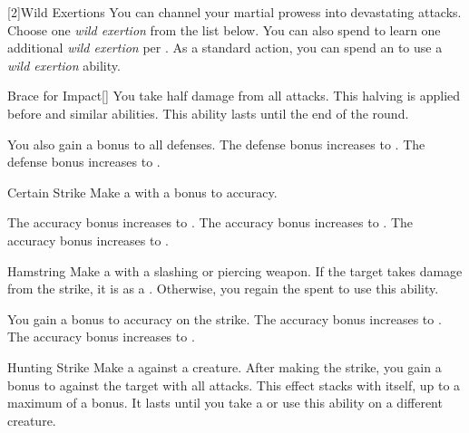         [2]{Wild Exertions} 
        You can channel your martial prowess into devastating attacks.
        Choose one \textit{wild exertion} from the list below.
        You can also spend  to learn one additional \textit{wild exertion} per .
        As a standard action, you can spend an  to use a \textit{wild exertion} ability.
        {
            \begin{freeability}{Brace for Impact}[]
                You take half damage from all attacks.
                This halving is applied before  and similar abilities.
                This ability lasts until the end of the round.

                \rankline
                 You also gain a  bonus to all defenses.
                 The defense bonus increases to .
                 The defense bonus increases to .
            \end{freeability}

            \begin{apability}{Certain Strike}
                Make a  with a  bonus to accuracy.

                \rankline
                 The accuracy bonus increases to .
                 The accuracy bonus increases to .
                 The accuracy bonus increases to .
            \end{apability}

            \begin{apability}{Hamstring}
                Make a  with a slashing or piercing weapon.
                If the target takes damage from the strike, it is  as a .
                Otherwise, you regain the  spent to use this ability.

                \rankline
                 You gain a  bonus to accuracy on the strike.
                 The accuracy bonus increases to .
                 The accuracy bonus increases to .
            \end{apability}

            \begin{freeability}{Hunting Strike}
                Make a  against a creature.
                After making the strike, you gain a  bonus to  against the target with all attacks.
                This effect stacks with itself, up to a maximum of a  bonus.
                It lasts until you take a  or use this ability on a different creature.


\end{freeability}}

